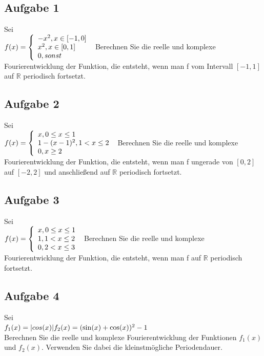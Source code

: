 \documentclass[11pt,final]{scrreprt}
\newcommand{\br} {\medskip\\}
\newcommand{\R} {\mathbb R}
\begin{document}
\subsection*{Aufgabe 1}
Sei\\
$
f(x) = \left\{
\begin{array}{l}
-x^2, x \in [-1,0] \\ 
x^2, x \in [0,1] \\
0, sonst\\
\end{array}
\right.\\\\
$
Berechnen Sie die reelle und komplexe Fourierentwicklung der Funktion, die entsteht, wenn man f vom Intervall $[-1,1]$ auf $\R$ periodisch fortsetzt.\br
	
\subsection*{Aufgabe 2}
Sei\\
$
f(x) = \left\{
\begin{array}{l}
x, 0\leq x\leq 1 \\ 
1-(x-1)^2, 1 < x\leq 2 \\
0, x \geq 2 \\
\end{array}
\right.\\\\
$
Berechnen Sie die reelle und komplexe Fourierentwicklung der Funktion, die entsteht, wenn man f ungerade von $[0,2]$ auf $[-2,2]$ und anschließend auf $\R$ periodisch fortsetzt.\br

\subsection*{Aufgabe 3}
Sei\\
$
f(x) = \left\{
\begin{array}{l}
x, 0\leq x\leq 1 \\ 
1, 1 < x\leq 2 \\
0, 2 < x\leq 3 \\
\end{array}
\right.\\\\
$
Berechnen Sie die reelle und komplexe Fourierentwicklung der Funktion, die entsteht, wenn man f auf $\R$ periodisch fortsetzt.\br

\subsection*{Aufgabe 4}
Sei\br
$
f_1(x) = |cos(x)|\\
f_2(x) = (\sin(x)+\cos(x))^2-1
$\br
Berechnen Sie die reelle und komplexe Fourierentwicklung der Funktionen $f_1(x)$ und $f_2(x)$. Verwenden Sie dabei die kleinstmögliche Periodendauer.\br
\end{document}
